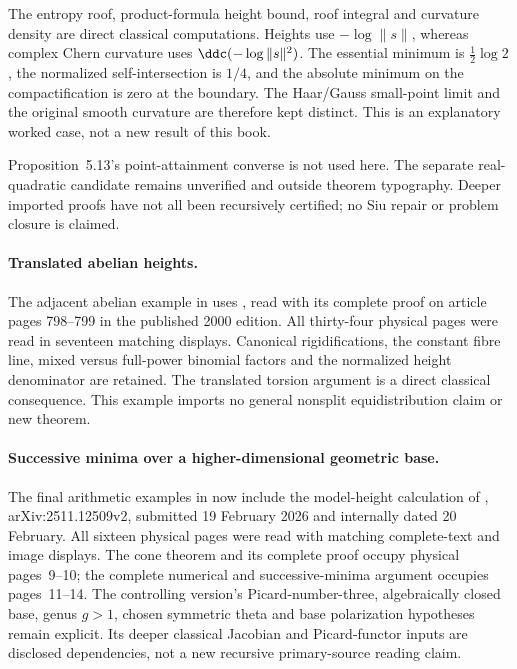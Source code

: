 The entropy roof, product-formula height bound, roof integral and
curvature density are direct classical computations. Heights use
$-\log\|s\|$, whereas complex Chern curvature uses
$\ddc(-\log\|s\|^2)$. The essential minimum is
$\frac12\log2$, the normalized self-intersection is $1/4$, and the
absolute minimum on the compactification is zero at the boundary.
The Haar/Gauss small-point limit and the original smooth curvature
are therefore kept distinct. This is an explanatory worked case,
not a new result of this book.

Proposition~5.13's point-attainment converse is not used here.
The separate real-quadratic candidate remains unverified and
outside theorem typography. Deeper imported proofs have not all
been recursively certified; no Siu repair or problem closure
is claimed.

\paragraph{Translated abelian heights.}
The adjacent abelian example in 
uses \cite[Theorem~2.5]{CL00Published}, read with its complete proof
on article pages 798--799 in the published 2000 edition. All
thirty-four physical pages were read in seventeen matching displays.
Canonical rigidifications, the constant fibre line, mixed versus
full-power binomial factors and the normalized height denominator
are retained. The translated torsion argument is a direct classical
consequence. This example imports no general nonsplit equidistribution
claim or new theorem.

\paragraph{Successive minima over a higher-dimensional geometric base.}
The final arithmetic examples in  now
include the model-height calculation of
\cite[Theorems~2.4 and~3.2]{GY26RelativeMinimaV2},
arXiv:2511.12509v2, submitted 19 February 2026 and internally dated
20 February. All sixteen physical pages were read with matching
complete-text and image displays. The cone theorem and its complete
proof occupy physical pages~9--10; the complete numerical and
successive-minima argument occupies pages~11--14.
The controlling version's Picard-number-three, algebraically closed
base, genus $g>1$, chosen symmetric theta and base polarization
hypotheses remain explicit. Its deeper classical Jacobian and
Picard-functor inputs are disclosed dependencies, not a new recursive
primary-source reading claim.

